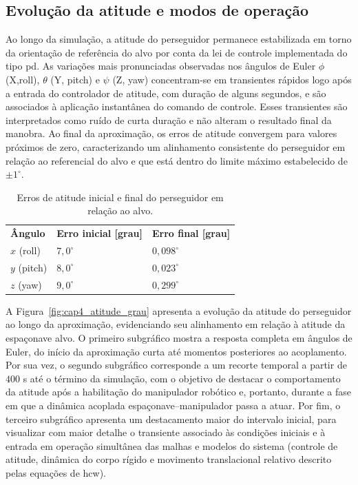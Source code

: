 \subsection{Evolução da atitude e modos de operação}
\label{sec:cap4_app_final_atitude}

Ao longo da simulação, a atitude do perseguidor permanece estabilizada em torno da orientação de referência do alvo por conta da lei de controle implementada do tipo \gls{pd}.
As variações mais pronunciadas observadas nos ângulos de Euler $\phi$ (X,roll), $\theta$ (Y, pitch) e $\psi$ (Z, yaw) concentram-se em transientes rápidos logo após a entrada do controlador de atitude, com duração de alguns segundos, e são associados à aplicação instantânea do comando de controle.
Esses transientes são interpretados como ruído de curta duração e não alteram o resultado final da manobra.
Ao final da aproximação, os erros de atitude convergem para valores próximos de zero, caracterizando um alinhamento consistente do perseguidor em relação ao referencial do alvo e que está dentro do limite máximo estabelecido de $\pm 1^{\circ}$.

\begin{table}[H]
\centering
\caption{Erros de atitude inicial e final do perseguidor em relação ao alvo.}
\label{tab:cap4_app_curta_erros_atitude}
\begin{tabularx}{\linewidth}{|
  >{\centering\arraybackslash}X|
  >{\centering\arraybackslash}X|
  >{\centering\arraybackslash}X|}
\hline
\textbf{Ângulo} &
\textbf{Erro inicial [grau]} &
\textbf{Erro final [grau]} \\
\hhline{|=|=|=|}
$x$ (roll)   & $7{,}0^\circ$  & $0{,}098^\circ$ \\
$y$ (pitch)& $8{,}0^\circ$  & $0{,}023^\circ$ \\
$z$ (yaw)    & $9{,}0^\circ$  & $0{,}299^\circ$ \\
\hline
\end{tabularx}
\end{table}

A Figura~\ref{fig:cap4_atitude_grau} apresenta a evolução da atitude do perseguidor ao longo da aproximação, evidenciando seu alinhamento em relação à atitude da espaçonave alvo.
O primeiro subgráfico mostra a resposta completa em ângulos de Euler, do início da aproximação curta até momentos posteriores ao acoplamento.
Por sua vez, o segundo subgráfico corresponde a um recorte temporal a partir de $400$ s até o término da simulação, com o objetivo de destacar o comportamento da atitude após a habilitação do manipulador robótico e, portanto, durante a fase em que a dinâmica acoplada espaçonave--manipulador passa a atuar.
Por fim, o terceiro subgráfico apresenta um destacamento maior do intervalo inicial, para visualizar com maior detalhe o transiente associado às condições iniciais e à entrada em operação simultânea das malhas e modelos do sistema (controle de atitude, dinâmica do corpo rígido e movimento translacional relativo descrito pelas equações de \gls{hcw}).


